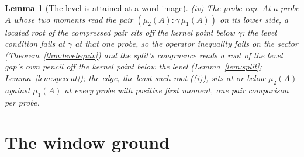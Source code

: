\documentclass[11pt]{article}
\newtheorem{lemma}{Lemma}
\theoremstyle{definition}
\begin{document}
\begin{lemma}[The level is attained at a word image]
\emph{(iv) The probe cap.} At a probe $A$ whose two moments read the
pair $(\mu_2(A)\!:\!\gamma\,\mu_1(A))$ on its lower side, a located
root of the compressed pair sits off the kernel point below
$\gamma$: the level condition fails at $\gamma$ at that one probe,
so the operator inequality fails on the sector
(Theorem~\ref{thm:levelequiv}) and the split's congruence reads
a root of the level gap's own pencil off the kernel point below
the level (Lemma~\ref{lem:split}; Lemma~\ref{lem:speccut}); the
edge, the least such root ((i)), sits at or below
$\mu_2(A)$ against $\mu_1(A)$ at every probe with positive first
moment, one pair comparison per probe.
\end{lemma}

\section{The window ground}
\end{document}
